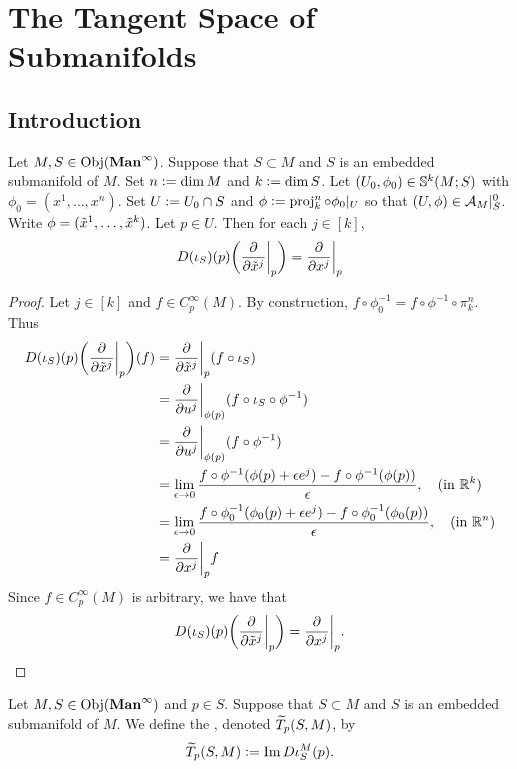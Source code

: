 \documentclass{book}
\begin{document}
	
	
	
	\newpage
	\section{The Tangent Space of Submanifolds}
	
	\subsection{Introduction}
	
	\begin{ex} 
		Let $M, S \in \Obj(\bManinf)$. Suppose that $S \subset M$ and $S$ is an embedded submanifold of $M$. Set $n \defeq \dim M$ and $k \defeq \dim S$. Let $(U_0, \phi_0) \in \S^k(M;S)$ with $\phi_0 = (x^1, \ldots, x^n)$. Set $U \defeq U_0 \cap S$ and $\phi \defeq \prj^n_k \circ \phi_0|_U$ so that $(U, \phi) \in \MA_M|_S^0$. Write $\phi = (\tl{x}^1, \ldots, \tl{x}^k)$. Let $p \in U$. Then for each $j \in [k]$, 
		$$D(\iota_S)(p)\bigg(\frac{\p }{\p \tl{x}^j}\bigg|_p \bigg) = \frac{\p }{\p x^j} \bigg|_p$$
	\end{ex}

	\begin{proof}
		Let $j \in [k]$ and $f \in C^{\infty}_p(M)$. By construction, $f \circ \phi_0^{-1} = f \circ \phi^{-1} \circ \pi^n_k$. Thus
		\begin{align*}
			D(\iota_S)(p)\bigg(\frac{\p }{\p \tl{x}^j}\bigg|_p \bigg) (f)
			& = \frac{\p }{\p \tl{x}^j}\bigg|_p(f \circ \iota_S) \\
			& = \frac{\p }{\p u^j}\bigg|_{\phi(p)} (f \circ \iota_S \circ \phi^{-1} ) \\
			& = \frac{\p }{\p u^j}\bigg|_{\phi(p)} (f \circ \phi^{-1} ) \\
			& = \lim_{\ep \rightarrow 0} \frac{f \circ \phi^{-1}(\phi(p) + \ep e^j) - f \circ \phi^{-1}(\phi(p)) }{ \ep} , \quad \text{(in $\R^k$)} \\
			& = \lim_{\ep \rightarrow 0} \frac{f \circ \phi_0^{-1}(\phi_0(p) + \ep e^j) - f \circ \phi_0^{-1}(\phi_0(p)) }{ \ep} , \quad \text{(in $\R^n$)}  \\
			& = \frac{\p }{\p x ^j} \bigg|_p f
		\end{align*}
		Since $f \in C^{\infty}_p(M)$ is arbitrary, we have that 
		$$D(\iota_S)(p)\bigg(\frac{\p }{\p \tl{x}^j}\bigg|_p \bigg) = \frac{\p }{\p x ^j} \bigg|_p.$$
	\end{proof}

	\begin{defn}
		Let $M, S \in \Obj(\bManinf)$ and $p \in S$. Suppose that $S \subset M$ and $S$ is an embedded submanifold of $M$. We define the , denoted $\wt{T}_p (S, M)$, by 
		$$\wt{T}_p (S, M) \defeq \Im D \iota^M_S(p).$$
	\end{defn}
\end{document}
